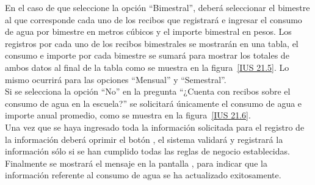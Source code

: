    En el caso de que seleccione la opción ``Bimestral'', deberá seleccionar el bimestre al que corresponde cada uno de los recibos que registrará e ingresar el consumo de agua por bimestre en metros cúbicos y el importe bimestral en pesos. Los registros por cada uno de los recibos bimestrales se mostrarán en una tabla, el consumo e importe por cada bimestre se sumará para mostrar los totales de ambos datos al final de la tabla como se muestra en la figura~\ref{IUS 21.5}. Lo mismo ocurrirá para las opciones ``Mensual'' y ``Semestral''. \\
    
    Si se selecciona la opción ``No'' en la pregunta ``¿Cuenta con recibos sobre el consumo de agua en la escuela?'' se solicitará únicamente el consumo de agua e importe anual promedio, como se muestra en la figura~\ref{IUS 21.6}.\\
    
    Una vez que se haya ingresado toda la información solicitada para el registro de la información deberá oprimir el botón , el sistema validará y registrará la información sólo si se han cumplido todas las reglas de negocio establecidas.\\
    
    Finalmente se mostrará el mensaje  en la pantalla , para indicar que la información referente al consumo de agua se ha actualizado exitosamente.
      
    


